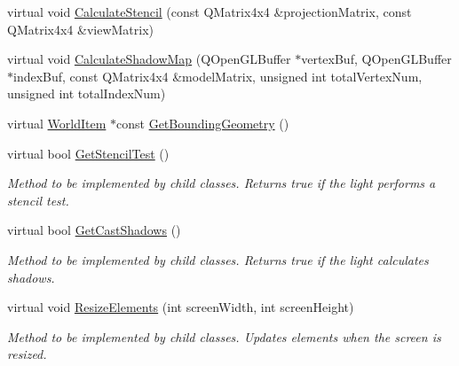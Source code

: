 \begin{DoxyCompactItemize}
\item 
virtual void \mbox{\hyperlink{class_geometry_engine_1_1_geometry_world_item_1_1_geometry_light_1_1_light_ae50fab4782158671041ac986dfead7fc}{Calculate\+Stencil}} (const Q\+Matrix4x4 \&projection\+Matrix, const Q\+Matrix4x4 \&view\+Matrix)
\item 
virtual void \mbox{\hyperlink{class_geometry_engine_1_1_geometry_world_item_1_1_geometry_light_1_1_light_a76aff3602f7bf26416c36111ab79f898}{Calculate\+Shadow\+Map}} (Q\+Open\+G\+L\+Buffer $\ast$vertex\+Buf, Q\+Open\+G\+L\+Buffer $\ast$index\+Buf, const Q\+Matrix4x4 \&model\+Matrix, unsigned int total\+Vertex\+Num, unsigned int total\+Index\+Num)
\item 
virtual \mbox{\hyperlink{class_geometry_engine_1_1_geometry_world_item_1_1_world_item}{World\+Item}} $\ast$const \mbox{\hyperlink{class_geometry_engine_1_1_geometry_world_item_1_1_geometry_light_1_1_light_a53cc9a8e7ab6eab9d34f1655ef33eaef}{Get\+Bounding\+Geometry}} ()
\item 
\mbox{\label{class_geometry_engine_1_1_geometry_world_item_1_1_geometry_light_1_1_light_ac057b7a5229d61154d8a79f4467eb042}} 
virtual bool \mbox{\hyperlink{class_geometry_engine_1_1_geometry_world_item_1_1_geometry_light_1_1_light_ac057b7a5229d61154d8a79f4467eb042}{Get\+Stencil\+Test}} ()
\begin{DoxyCompactList}\small\item\em Method to be implemented by child classes. Returns true if the light performs a stencil test. \end{DoxyCompactList}\item 
\mbox{\label{class_geometry_engine_1_1_geometry_world_item_1_1_geometry_light_1_1_light_a3c5c36c23bc16960b6d3232c33673e0a}} 
virtual bool \mbox{\hyperlink{class_geometry_engine_1_1_geometry_world_item_1_1_geometry_light_1_1_light_a3c5c36c23bc16960b6d3232c33673e0a}{Get\+Cast\+Shadows}} ()
\begin{DoxyCompactList}\small\item\em Method to be implemented by child classes. Returns true if the light calculates shadows. \end{DoxyCompactList}\item 
\mbox{\label{class_geometry_engine_1_1_geometry_world_item_1_1_geometry_light_1_1_light_a18009ba6ef9c788f3d33d1ebd78a2140}} 
virtual void \mbox{\hyperlink{class_geometry_engine_1_1_geometry_world_item_1_1_geometry_light_1_1_light_a18009ba6ef9c788f3d33d1ebd78a2140}{Resize\+Elements}} (int screen\+Width, int screen\+Height)
\begin{DoxyCompactList}\small\item\em Method to be implemented by child classes. Updates elements when the screen is resized. \end{DoxyCompactList}\end{DoxyCompactItemize}

